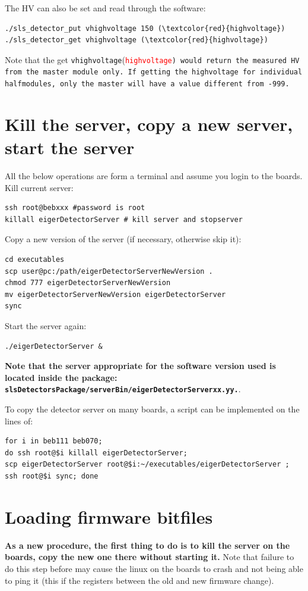 \documentclass{article}
\begin{document}
{{{The HV can also be set and read through the software:
\begin{verbatim}
./sls_detector_put vhighvoltage 150 (\textcolor{red}{highvoltage})
./sls_detector_get vhighvoltage (\textcolor{red}{highvoltage})
\end{verbatim}
Note that the get {\tt{vhighvoltage}}(\tt{\textcolor{red}{highvoltage}}) would return the measured HV from the master module only. If getting the highvoltage for individual halfmodules, only the master will have a value different from -999.

\appendix

\section{Kill the server, copy a new server, start the server}\label{server}
All the below operations are form a terminal and assume you login to the boards.\\
Kill current server:
\begin{verbatim}
ssh root@bebxxx #password is root
killall eigerDetectorServer # kill server and stopserver
\end{verbatim}
Copy a new version of the server (if necessary, otherwise skip it):
\begin{verbatim}
cd executables
scp user@pc:/path/eigerDetectorServerNewVersion .
chmod 777 eigerDetectorServerNewVersion
mv eigerDetectorServerNewVersion eigerDetectorServer
sync
\end{verbatim}
Start the server again:
\begin{verbatim}
./eigerDetectorServer &
\end{verbatim}
\textbf{Note that the server appropriate for the software version used is located inside the package: {\tt{slsDetectorsPackage/serverBin/eigerDetectorServerxx.yy.}}}.

To copy the detector server on many boards, a script can be implemented on the lines of:
\begin{verbatim}
for i in beb111 beb070; 
do ssh root@$i killall eigerDetectorServer; 
scp eigerDetectorServer root@$i:~/executables/eigerDetectorServer ; 
ssh root@$i sync; done
\end{verbatim}

\section{Loading firmware bitfiles}

\textbf{As a new procedure, the first thing to do is to kill the server on the boards, copy the new one there without starting it.} Note that failure to do this step before may cause the linux on the boards to crash and not being able to ping it (this if the registers between the old and new firmware change).

}}}
\end{document}
